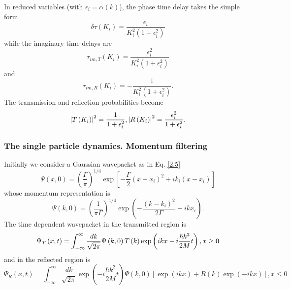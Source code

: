 \documentclass[preprint,aps]{revtex4}
\begin{document}
In reduced variables (with $\epsilon_i=\alpha(k)$), the phase time delay takes the simple form%
\begin{equation}
	\delta \tau \left( K_{i}\right) =\frac{\epsilon _{i}}{K_{i}^{2}\left(
		1+\epsilon _{i}^{2}\right) }
\end{equation}%
while the imaginary time delays are
\begin{equation}
	\tau _{im,T}\left( K_{i}\right) =\frac{\epsilon _{i}^{2}}{K_{i}^{2}\left(
		1+\epsilon _{i}^{2}\right) }
\end{equation}%
and%
\begin{equation}
	\tau _{im,R}\left( K_{i}\right) =-\frac{1}{K_{i}^{2}\left( 1+\epsilon
		_{i}^{2}\right) }.
\end{equation}%
The transmission and reflection probabilities become
\begin{equation}
	\left\vert T\left( K_{i}\right) \right\vert ^{2}=\frac{1}{1+\epsilon _{i}^{2}%
	},\left\vert R\left( K_{i}\right) \right\vert ^{2}=\frac{\epsilon _{i}^{2}}{%
		1+\epsilon _{i}^{2}}.
\end{equation}%




\subsubsection{The single particle dynamics. Momentum filtering}

Initially we consider a Gaussian wavepacket as in Eq. \ref{2.5}
\begin{equation}
\Psi \left( x,0\right) =\left( \frac{\Gamma }{\pi }\right) ^{1/4}\exp \left[
-\frac{\Gamma }{2}\left( x-x_{i}\right) ^{2}+ik_{i}\left( x-x_{i}\right) %
\right]  \label{3.12}
\end{equation}%
whose momentum representation is
\begin{equation}
\Psi \left( k,0\right) =\left( \frac{1}{\pi \Gamma }\right) ^{1/4}\exp
\left( -\frac{\left( k-k_{i}\right) ^{2}}{2\Gamma }-ikx_{i}\right) .
\label{3.13}
\end{equation}%
The time dependent wavepacket in the transmitted region is
\begin{equation}
\Psi _{T}\left( x,t\right) =\int_{-\infty }^{\infty }\frac{dk}{\sqrt{2\pi }}%
\Psi \left( k,0\right) T\left( k\right) \exp \left( ikx-i\frac{\hbar k^{2}}{%
2M}t\right) ,x\geq 0  \label{3.14}
\end{equation}%
and in the reflected region is%
\begin{equation}
\Psi _{R}\left( x,t\right) =\int_{-\infty }^{\infty }\frac{dk}{\sqrt{2\pi }}%
\exp \left( -i\frac{\hbar k^{2}}{2M}t\right) \Psi \left( k,0\right) \left[
\exp \left( ikx\right) +R\left( k\right) \exp \left( -ikx\right) \right]
,x\leq 0  \label{3.15}
\end{equation}
\end{document}
